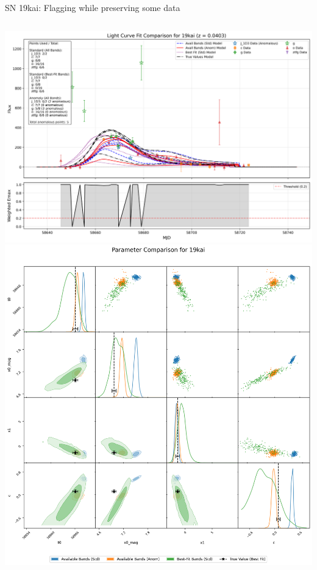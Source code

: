 \documentclass[aspectratio=169]{beamer}
\begin{document}
\begin{frame}{SN 19kai: Flagging while preserving some data}
  \begin{columns}
    \includegraphics[width=1\textwidth]{images/light_curve_comparison_19kai.png}
    \includegraphics[width=1\textwidth]{images/corner_comparison_19kai.png}
  \end{columns}
\end{frame}
\end{document}
